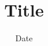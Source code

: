 \documentclass[12pt]{src/umons/memoire-umons}
\date{Date}
\title{Title}
\begin{document}
\kant
\end{document}
